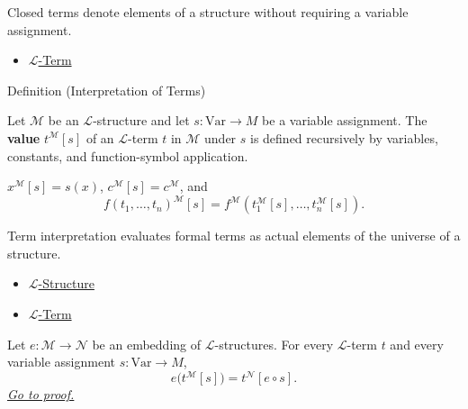 \begin{remark*}[Interpretation]
Closed terms denote elements of a structure without requiring a variable
assignment.
\end{remark*}

\begin{dependencies}
\begin{itemize}
  \item \hyperref[def:l-term]{$\mathcal{L}$-Term}
\end{itemize}
\end{dependencies}

\begin{definitionbox}{Definition (Interpretation of Terms)}
\begin{definition}\label{def:term-interpretation}
Let $\mathcal{M}$ be an $\mathcal{L}$-structure and let
$s\colon\mathrm{Var}\to M$ be a variable assignment. The
\textbf{value} $t^{\mathcal{M}}[s]$ of an $\mathcal{L}$-term $t$ in
$\mathcal{M}$ under $s$ is defined recursively by variables, constants, and
function-symbol application.
\end{definition}
\end{definitionbox}

\begin{remark*}
$x^{\mathcal{M}}[s]=s(x)$,
$c^{\mathcal{M}}[s]=c^{\mathcal{M}}$, and
\[
  f(t_1,\ldots,t_n)^{\mathcal{M}}[s]
  =
  f^{\mathcal{M}}(t_1^{\mathcal{M}}[s],\ldots,t_n^{\mathcal{M}}[s]).
\]
\end{remark*}

\begin{remark*}[Interpretation]
Term interpretation evaluates formal terms as actual elements of the universe
of a structure.
\end{remark*}

\begin{dependencies}
\begin{itemize}
  \item \hyperref[def:l-structure]{$\mathcal{L}$-Structure}
  \item \hyperref[def:l-term]{$\mathcal{L}$-Term}
\end{itemize}
\end{dependencies}

\begin{proposition}\label{prop:embeddings-preserve-term-interpretation}
Let $e\colon\mathcal{M}\to\mathcal{N}$ be an embedding of
$\mathcal{L}$-structures. For every $\mathcal{L}$-term $t$ and every variable
assignment $s\colon\mathrm{Var}\to M$,
\[
  e\bigl(t^{\mathcal{M}}[s]\bigr)
  =
  t^{\mathcal{N}}[e\circ s].
\]
\hyperref[prf:embeddings-preserve-term-interpretation]{\textit{Go to proof.}}
\end{proposition}

